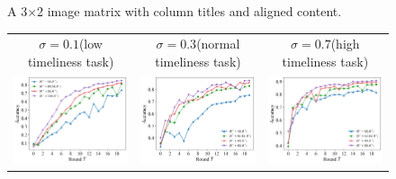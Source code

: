 \documentclass{article}
\theoremstyle{plain}
\theoremstyle{definition}
\theoremstyle{remark}
\begin{document}
\begin{figure}[htbp]
\begin{tabular}{ccc}
    \end{tabular}
    \caption{A 3×2 image matrix with column titles and aligned content.}
    \label{fig:server_accuracy_theta}
\end{figure}

\begin{figure}[htbp] %
  \centering
  
  \begin{tabular}{ccc} %
      \multicolumn{1}{c}{$\sigma=0.1$(low timeliness task)} &
      \multicolumn{1}{c}{$\sigma=0.3$(normal timeliness task)} &
      \multicolumn{1}{c}{$\sigma=0.7$(high timeliness task)} \\ %
      
      \includegraphics[width=0.3\linewidth]{figures/figure_74_A.png} &
      \includegraphics[width=0.3\linewidth]{figures/figure_74_B.png} &
      \includegraphics[width=0.3\linewidth]{figures/figure_74_C.png} \\ %
      

\end{tabular}
\end{figure}
\end{document}
